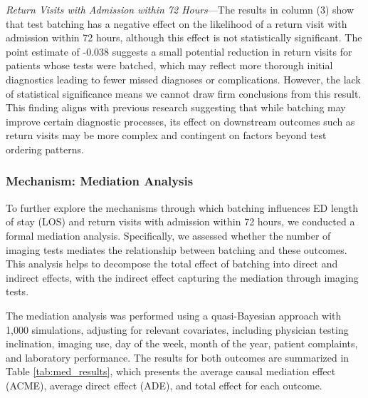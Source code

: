 \documentclass{article}
\begin{document}
\emph{Return Visits with Admission within 72 Hours}---The results in
column (3) show that test batching has a negative effect on the
likelihood of a return visit with admission within 72 hours, although
this effect is not statistically significant. The point estimate of
-0.038 suggests a small potential reduction in return visits for
patients whose tests were batched, which may reflect more thorough
initial diagnostics leading to fewer missed diagnoses or complications.
However, the lack of statistical significance means we cannot draw firm
conclusions from this result. This finding aligns with previous research
suggesting that while batching may improve certain diagnostic processes,
its effect on downstream outcomes such as return visits may be more
complex and contingent on factors beyond test ordering patterns.

\hypertarget{mechanism-mediation-analysis}{%
\subsubsection{Mechanism: Mediation
Analysis}\label{mechanism-mediation-analysis}}

To further explore the mechanisms through which batching influences ED
length of stay (LOS) and return visits with admission within 72 hours,
we conducted a formal mediation analysis. Specifically, we assessed
whether the number of imaging tests mediates the relationship between
batching and these outcomes. This analysis helps to decompose the total
effect of batching into direct and indirect effects, with the indirect
effect capturing the mediation through imaging tests.

The mediation analysis was performed using a quasi-Bayesian approach
with 1,000 simulations, adjusting for relevant covariates, including
physician testing inclination, imaging use, day of the week, month of
the year, patient complaints, and laboratory performance. The results
for both outcomes are summarized in Table \ref{tab:med_results}, which
presents the average causal mediation effect (ACME), average direct
effect (ADE), and total effect for each outcome.
\end{document}
